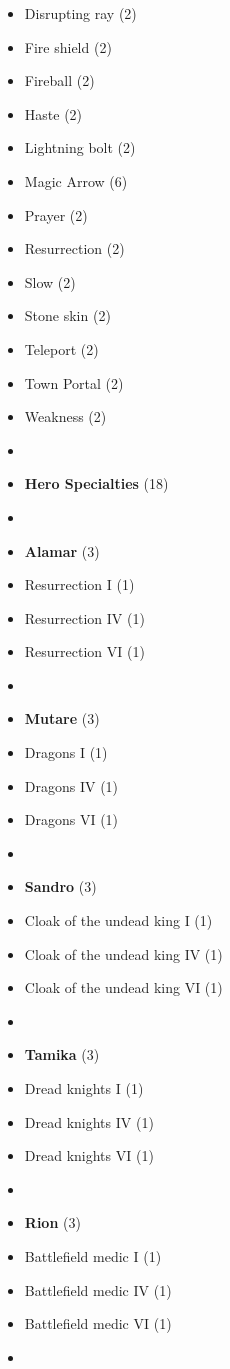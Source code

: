 \begin{multicols*}{3}
\begin{itemize}[leftmargin=0pt, label={}, noitemsep]
  \item Disrupting ray (2)
  \item Fire shield (2)
  \item Fireball (2)
  \item Haste (2)
  \item Lightning bolt (2)
  \item Magic Arrow (6)
  \item Prayer (2)
  \item Resurrection (2)
  \item Slow (2)
  \item Stone skin (2)
  \item Teleport (2)
  \item Town Portal (2)
  \item Weakness (2)
  \item
  \item \textbf{Hero Specialties} (18)
  \item
  \item \textbf{Alamar} (3)
  \item Resurrection I (1)
  \item Resurrection IV (1)
  \item Resurrection VI (1)
  \item
  \item \textbf{Mutare} (3)
  \item Dragons I (1)
  \item Dragons IV (1)
  \item Dragons VI (1)
  \item
  \item \textbf{Sandro} (3)
  \item Cloak of the undead king I (1)
  \item Cloak of the undead king IV (1)
  \item Cloak of the undead king VI (1)
  \item
  \item \textbf{Tamika} (3)
  \item Dread knights I (1)
  \item Dread knights IV (1)
  \item Dread knights VI (1)
  \item
  \item \textbf{Rion} (3)
  \item Battlefield medic I (1)
  \item Battlefield medic IV (1)
  \item Battlefield medic VI (1)
  \item

\end{itemize}
\end{multicols*}
